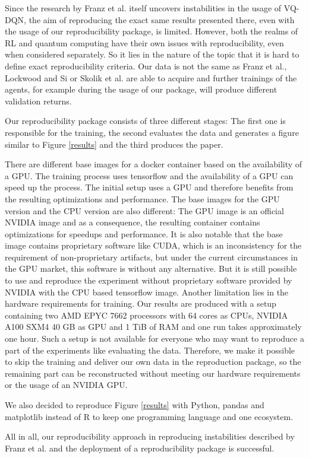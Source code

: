 Since the research by Franz et al. itself uncovers instabilities in the usage of \ac{VQ-DQN}, the aim of reproducing the exact same results presented there, even with the usage of our reproducibility package, is limited. 
However, both the realms of \ac{RL}\autocite{rlrepro} and quantum computing\autocite{quantumrepro} have their own issues with reproducibility, even when considered separately. 
So it lies in the nature of the topic that it is hard to define exact reproducibility criteria.
Our data is not the same as Franz et al., Lockwood and Si or Skolik et al. are able to acquire and further trainings of the agents, for example during the usage of our package, will produce different validation returns.


Our reproducibility package consists of three different stages: The first one is responsible for the training, the second evaluates the data and generates a figure similar to Figure \ref{results} and the third produces the paper. 

There are different base images for a docker container based on the availability of a GPU. 
The training process uses tensorflow and the availability of a GPU can speed up the process. 
The initial setup uses a GPU and therefore benefits from the resulting optimizations and performance.
The base images for the GPU version and the CPU version are also different: The GPU image is an official NVIDIA image and as a consequence, the resulting container contains optimizations for speedups and performance. 
It is also notable that the base image contains proprietary software like CUDA, which is an inconsistency for the requirement of non-proprietary artifacts, but under the current circumstances in the GPU market, this software is without any alternative.
But it is still possible to use and reproduce the experiment without proprietary software provided by NVIDIA with the CPU based tensorflow image.
Another limitation lies in the hardware requirements for training. 
Our results are produced with a setup containing two AMD EPYC 7662 processors with 64 cores as CPUs, NVIDIA A100 SXM4 40 GB as GPU and 1 TiB of RAM and one run takes approximately one hour. 
Such a setup is not available for everyone who may want to reproduce a part of the experiments like evaluating the data. 
Therefore, we make it possible to skip the training and deliver our own data in the reproduction package, so the remaining part can be reconstructed without meeting our hardware requirements or the usage of an NVIDIA GPU. 

We also decided to reproduce Figure \ref{results} with Python, pandas and matplotlib instead of R to keep one programming language and one ecosystem. 

All in all, our reproducibility approach in reproducing instabilities described by Franz et al. and the deployment of a reproducibility package is successful.


